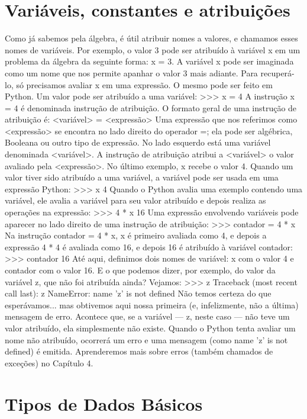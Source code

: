     \section{Variáveis, constantes e atribuições}
Como já sabemos pela álgebra, é
útil atribuir nomes a valores, e chamamos esses nomes de variáveis. Por exemplo, o valor 3 pode
ser atribuído à variável x em um problema da álgebra da seguinte forma: x = 3. A variável x pode
ser imaginada como um nome que nos permite apanhar o valor 3 mais adiante. Para recuperá-lo,
só precisamos avaliar x em uma expressão.
O mesmo pode ser feito em Python. Um valor pode ser atribuído a uma variável:
>>> x = 4
A instrução x = 4 é denominada instrução de atribuição. O formato geral de uma instrução de
atribuição é:
<variável> = <expressão>
Uma expressão que nos referimos como <expressão> se encontra no lado direito do
operador =; ela pode ser algébrica, Booleana ou outro tipo de expressão. No lado esquerdo está
uma variável denominada <variável>. A instrução de atribuição atribui a <variável> o
valor avaliado pela <expressão>. No último exemplo, x recebe o valor 4.
Quando um valor tiver sido atribuído a uma variável, a variável pode ser usada em uma
expressão Python:
>>> x
4
Quando o Python avalia uma exemplo contendo uma variável, ele avalia a variável para seu valor
atribuído e depois realiza as operações na expressão:
>>> 4 * x
16
Uma expressão envolvendo variáveis pode aparecer no lado direito de uma instrução de
atribuição:
>>> contador = 4 * x
Na instrução contador = 4 * x, x é primeiro avaliada como 4, e depois a expressão 4 * 4 é
avaliada como 16, e depois 16 é atribuído à variável contador:
>>> contador
16
Até aqui, definimos dois nomes de variável: x com o valor 4 e contador com o valor 16.
E o que podemos dizer, por exemplo, do valor da variável z, que não foi atribuída ainda?
Vejamos:
>>> z
Traceback (most recent call last):
z
NameError: name 'z' is not defined
Não temos certeza do que esperávamos... mas obtivemos aqui nossa primeira (e, infelizmente,
não a última) mensagem de erro. Acontece que, se a variável — z, neste caso — não teve um
valor atribuído, ela simplesmente não existe. Quando o Python tenta avaliar um nome não
atribuído, ocorrerá um erro e uma mensagem (como name 'z' is not defined) é emitida.
Aprenderemos mais sobre erros (também chamados de exceções) no Capítulo 4.

    \section{Tipos de Dados B\'{a}sicos}


